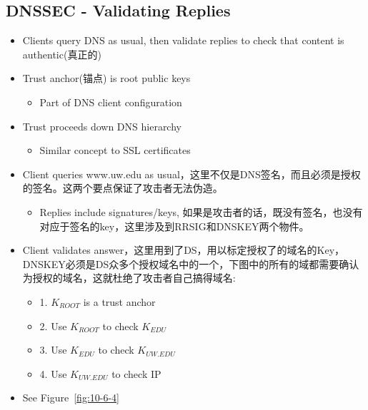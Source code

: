 \documentclass[12pt]{ctexart}   %
\begin{document}
	\subsection{DNSSEC - Validating Replies}
	\begin{itemize}
		\item Clients query DNS as usual, then validate replies to check that content is authentic(真正的)
		
		\item Trust anchor(锚点) is root public keys
		\begin{itemize}
			\item Part of DNS client configuration
		\end{itemize}

		\item Trust proceeds down DNS hierarchy
		\begin{itemize}
			\item Similar concept to SSL certificates
		\end{itemize}
	
		\item Client queries www.uw.edu as usual，这里不仅是DNS签名，而且必须是授权的签名。这两个要点保证了攻击者无法伪造。
		\begin{itemize}
			\item Replies include signatures/keys, 如果是攻击者的话，既没有签名，也没有对应于签名的key，这里涉及到RRSIG和DNSKEY两个物件。
		\end{itemize}

		\item Client validates answer，这里用到了DS，用以标定授权了的域名的Key，DNSKEY必须是DS众多个授权域名中的一个，下图中的所有的域都需要确认为授权的域名，这就杜绝了攻击者自己搞得域名:
		\begin{itemize}
			\item {\color{blue} 1.} $K_{ROOT}$ is a trust anchor
			\item {\color{blue} 2.} Use $K_{ROOT}$ to check $K_{EDU}$
			\item {\color{blue} 3.} Use $K_{EDU}$ to check $K_{UW.EDU}$
			\item {\color{blue} 4.} Use $K_{UW.EDU}$ to check IP
		\end{itemize}
		\item See Figure~\ref{fig:10-6-4}
		  

\end{itemize}
\end{document}
